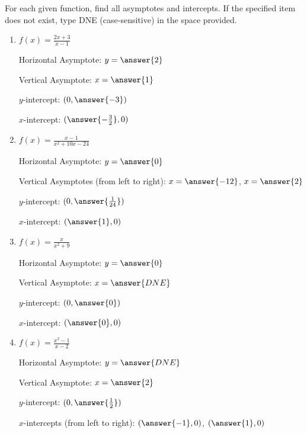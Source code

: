 \documentclass{ximera}
\begin{document}
 \begin{problem}\label{prob:160hom6prob2} 
 For each given function, find all asymptotes and intercepts.   If the specified item does not exist, type DNE (case-sensitive) in the space provided.  
  \begin{enumerate}
\item
$f(x)=\frac{2x+3}{x-1}$

Horizontal Asymptote: $y=\answer{2}$

Vertical Asymptote: $x=\answer{1}$

$y$-intercept: $(0, \answer{-3})$

$x$-intercept: $(\answer{-\frac{3}{2}},0)$

\item
$f(x)=\frac{x-1}{x^2+10x-24}$

Horizontal Asymptote: $y=\answer{0}$

Vertical Asymptotes (from left to right): $x=\answer{-12}$, $x=\answer{2}$

$y$-intercept: $(0, \answer{\frac{1}{24}})$

$x$-intercept: $(\answer{1},0)$
\item
$f(x)=\frac{x}{x^2+9}$

Horizontal Asymptote: $y=\answer{0}$

Vertical Asymptote: $x=\answer{DNE}$

$y$-intercept: $(0, \answer{0})$

$x$-intercept: $(\answer{0},0)$

\item
$f(x)=\frac{x^2-1}{x-2}$

Horizontal Asymptote: $y=\answer{DNE}$

Vertical Asymptote: $x=\answer{2}$

$y$-intercept: $(0, \answer{\frac{1}{2}})$

$x$-intercepts (from left to right): $(\answer{-1},0)$, $(\answer{1},0)$
  \end{enumerate}
\end{problem}
 
\end{document}
